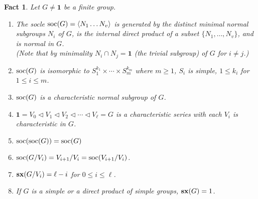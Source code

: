 \documentclass[a4paper,11pt]{amsart}
\newtheorem{fact}[theorem]{Fact}
\theoremstyle{definition}
\newcommand{\sx}{{\bf sx}}
\newcommand{\soc}{\mbox{\rm soc}}
\newcommand{\1}{{\mathbf 1}}
\begin{document}
\begin{fact} Let $G\neq \1$ be a finite group. \label{socle-fact}
\begin{enumerate} 
\item \label{socisproduct} The socle  $\soc(G)=\langle N_1 \ldots N_v \rangle$ is generated by the distinct minimal normal subgroups $N_i$ of $G$, is the internal direct product of a subset  $\{N_1, \ldots, N_v\}$, and is normal in $G$. 
\\ (Note that by minimality $N_i \cap N_j = \1$ (the trivial subgroup) of $G$ for  $i\neq j$.)
\item $\soc(G)$ is isomorphic to $S_1^{k_1} \times \cdots \times S_m^{k_m}$   where $m\geq 1$,  $S_i$ is simple,
$1 \leq k_i$ for $1 \leq i \leq m$. 
\item $\soc(G)$ is a characteristic normal subgroup of $G$. \label{socChar}
\item  $\1 =V_0 \lhd V_1 \lhd V_2 \lhd \cdots \lhd  V_{\ell} =G$ is a characteristic series with each $V_i$ is characteristic  in $G$.  \label{socCharSeries}
\item $\soc(\soc(G))=\soc(G)$ \label{SocIdempotent}
\item $\soc(G/V_i)=V_{i+1}/V_i=\soc(V_{i+1}/V_i)$.  \label{SocQuotients}
\item  \label{SmoothSocSeries}$\sx(G/V_i)=\ell-i$
for $0\leq i \leq \ell$.
\item If $G$ is a simple or a direct product of simple groups,  $\sx(G)=1$. \label{spxsimple}
\end{enumerate}
\end{fact}
\end{document}

